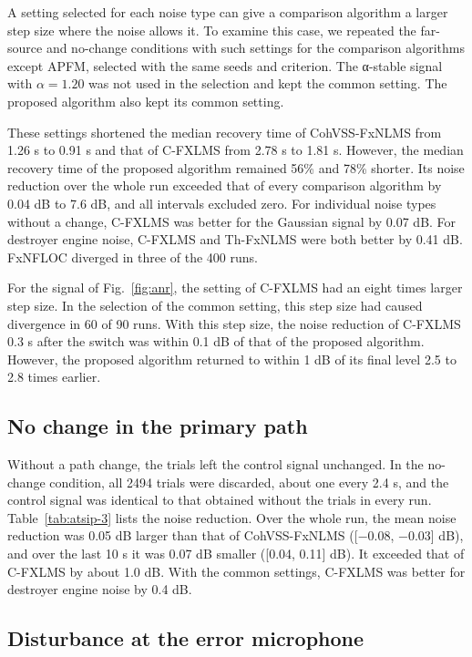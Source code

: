 \documentclass[sip,biber]{now-journal}
\begin{document}
A setting selected for each noise type can give a comparison algorithm a larger step size where the noise allows it. To examine this case, we repeated the far-source and no-change conditions with such settings for the comparison algorithms except APFM, selected with the same seeds and criterion. The α-stable signal with \(\alpha = 1.20\) was not used in the selection and kept the common setting. The proposed algorithm also kept its common setting.

These settings shortened the median recovery time of CohVSS-FxNLMS from 1.26 s to 0.91 s and that of C-FXLMS from 2.78 s to 1.81 s. However, the median recovery time of the proposed algorithm remained 56\% and 78\% shorter. Its noise reduction over the whole run exceeded that of every comparison algorithm by 0.04 dB to 7.6 dB, and all intervals excluded zero. For individual noise types without a change, C-FXLMS was better for the Gaussian signal by 0.07 dB. For destroyer engine noise, C-FXLMS and Th-FxNLMS were both better by 0.41 dB. FxNFLOC diverged in three of the 400 runs.

For the signal of Fig.~\ref{fig:anr}, the setting of C-FXLMS had an eight times larger step size. In the selection of the common setting, this step size had caused divergence in 60 of 90 runs. With this step size, the noise reduction of C-FXLMS 0.3 s after the switch was within 0.1 dB of that of the proposed algorithm. However, the proposed algorithm returned to within 1 dB of its final level 2.5 to 2.8 times earlier.

\hypertarget{sec:6.4}{%
\subsection{No change in the primary path}\label{sec:6.4}}



Without a path change, the trials left the control signal unchanged. In the no-change condition, all 2494 trials were discarded, about one every 2.4 s, and the control signal was identical to that obtained without the trials in every run. Table~\ref{tab:atsip-3} lists the noise reduction. Over the whole run, the mean noise reduction was 0.05 dB larger than that of CohVSS-FxNLMS ({[}−0.08, −0.03{]} dB), and over the last 10 s it was 0.07 dB smaller ({[}0.04, 0.11{]} dB). It exceeded that of C-FXLMS by about 1.0 dB. With the common settings, C-FXLMS was better for destroyer engine noise by 0.4 dB.

\hypertarget{sec:6.5}{%
\subsection{Disturbance at the error microphone}\label{sec:6.5}}
\end{document}
